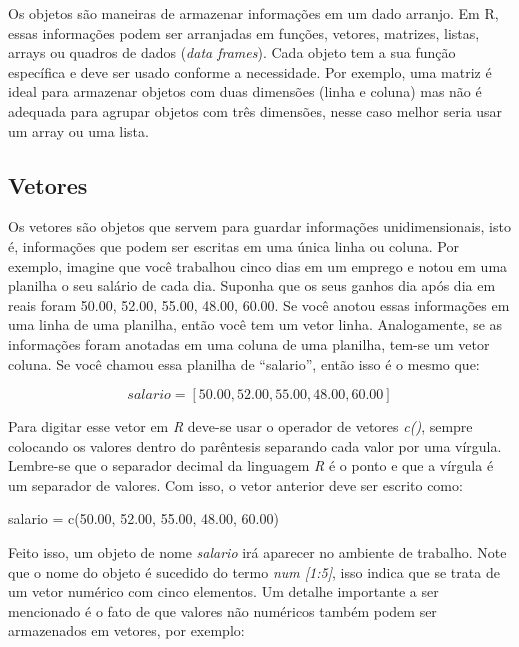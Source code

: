 \documentclass[
  letterpaper,
  DIV=11,
  numbers=noendperiod]{scrreprt}
\newenvironment{Shaded}{\begin{snugshade}}{\end{snugshade}}
\newcommand{\FloatTok}[1]{\textcolor[rgb]{0.68,0.00,0.00}{#1}}
\newcommand{\FunctionTok}[1]{\textcolor[rgb]{0.28,0.35,0.67}{#1}}
\newcommand{\NormalTok}[1]{\textcolor[rgb]{0.00,0.23,0.31}{#1}}
\newcommand{\OtherTok}[1]{\textcolor[rgb]{0.00,0.23,0.31}{#1}}
\begin{document}
Os objetos são maneiras de armazenar informações em um dado arranjo. Em
R, essas informações podem ser arranjadas em funções, vetores, matrizes,
listas, arrays ou quadros de dados (\emph{data frames}). Cada objeto tem
a sua função específica e deve ser usado conforme a necessidade. Por
exemplo, uma matriz é ideal para armazenar objetos com duas dimensões
(linha e coluna) mas não é adequada para agrupar objetos com três
dimensões, nesse caso melhor seria usar um array ou uma lista.

\subsection{Vetores}\label{vetores}

Os vetores são objetos que servem para guardar informações
unidimensionais, isto é, informações que podem ser escritas em uma única
linha ou coluna. Por exemplo, imagine que você trabalhou cinco dias em
um emprego e notou em uma planilha o seu salário de cada dia. Suponha
que os seus ganhos dia após dia em reais foram 50.00, 52.00, 55.00,
48.00, 60.00. Se você anotou essas informações em uma linha de uma
planilha, então você tem um vetor linha. Analogamente, se as informações
foram anotadas em uma coluna de uma planilha, tem-se um vetor coluna. Se
você chamou essa planilha de ``salario'', então isso é o mesmo que:

\[
salario = [50.00, 52.00, 55.00,48.00,60.00]
\]

Para digitar esse vetor em \emph{R} deve-se usar o operador de vetores
\emph{c()}, sempre colocando os valores dentro do parêntesis separando
cada valor por uma vírgula. Lembre-se que o separador decimal da
linguagem \emph{R} é o ponto e que a vírgula é um separador de valores.
Com isso, o vetor anterior deve ser escrito como:

\begin{Shaded}
\begin{Highlighting}[]
\NormalTok{salario }\OtherTok{=} \FunctionTok{c}\NormalTok{(}\FloatTok{50.00}\NormalTok{, }\FloatTok{52.00}\NormalTok{, }\FloatTok{55.00}\NormalTok{, }\FloatTok{48.00}\NormalTok{, }\FloatTok{60.00}\NormalTok{)}
\end{Highlighting}
\end{Shaded}

Feito isso, um objeto de nome \emph{salario} irá aparecer no ambiente de
trabalho. Note que o nome do objeto é sucedido do termo \emph{num
{[}1:5{]}}, isso indica que se trata de um vetor numérico com cinco
elementos. Um detalhe importante a ser mencionado é o fato de que
valores não numéricos também podem ser armazenados em vetores, por
exemplo:
\end{document}
